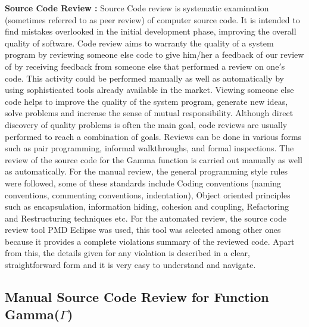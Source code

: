 \documentclass[12pt]{report}
\begin{document}
{\newline
\noindent\textbf{Source Code Review : }
Source Code review is systematic examination (sometimes referred to as peer review) of computer source code. It is intended to find mistakes overlooked in the initial development phase, improving the overall quality of software. Code review aims to warranty the quality of a system program by reviewing someone else code to give him/her a feedback of our review of by receiving feedback from someone else that performed a review on one$'$s code.
This activity could be performed manually as well as automatically by using
sophisticated tools already available in the market.
Viewing someone else code helps to improve the quality of the system program,
generate new ideas, solve problems and increase the sense of mutual
responsibility. Although direct discovery of quality problems is often the
main goal, code reviews are usually performed to reach a combination of
goals.
Reviews can be done in various forms such as pair programming, informal walkthroughs, and formal inspections.
\newline
\indent The review of the source code for the Gamma function is carried out manually as well as automatically. For the manual review, the general programming style
rules were followed, some of these standards include Coding conventions (naming conventions, commenting conventions, indentation), Object oriented principles such as encapsulation, information hiding, cohesion and coupling, Refactoring and Restructuring techniques etc. 
For the automated review, the source code review tool PMD Eclipse was used, this
tool was selected among other ones because it provides a complete violations
summary of the reviewed code. Apart from this, the details given for any violation is described in a clear, straightforward form and it is very easy to understand and navigate.

\clearpage
\subsection{Manual Source Code Review for Function Gamma($\Gamma$)}

}
\end{document}
